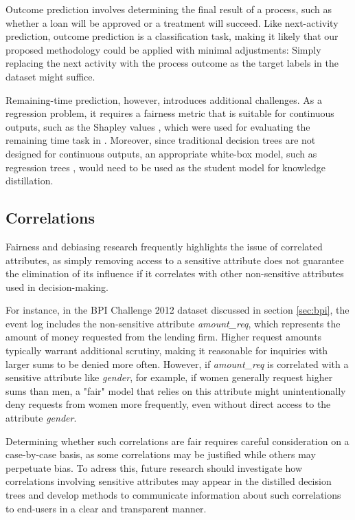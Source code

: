 Outcome prediction involves determining the final result of a process,
such as whether a loan will be approved or a treatment will succeed.
Like next-activity prediction, outcome prediction is a classification task,
making it likely that our proposed methodology could be applied with minimal adjustments:
Simply replacing the next activity with the process outcome as the target labels in the dataset might suffice.

Remaining-time prediction, however, introduces additional challenges.
As a regression problem, it requires a fairness metric that is suitable for continuous outputs,
such as the Shapley values \cite{shapley}, which were used for evaluating the remaining time task in \cite{fairness_adversarial}. 
Moreover, since traditional decision trees are not designed for continuous outputs,
an appropriate white-box model, such as regression trees \cite{trees},
would need to be used as the student model for knowledge distillation.

\subsection*{Correlations}
Fairness and debiasing research frequently highlights the issue of correlated attributes,
as simply removing access to a sensitive attribute does not guarantee the elimination of its influence
if it correlates with other non-sensitive attributes used in decision-making.

For instance, in the BPI Challenge 2012 dataset discussed in section \ref{sec:bpi},
the event log includes the non-sensitive attribute \textit{amount\_req},
which represents the amount of money requested from the lending firm.
Higher request amounts typically warrant additional scrutiny,
making it reasonable for inquiries with larger sums to be denied more often. 
However, if \textit{amount\_req} is correlated with a sensitive attribute like \textit{gender},
for example, if women generally request higher sums than men,
a "fair" model that relies on this attribute might unintentionally deny requests from women more frequently,
even without direct access to the attribute \textit{gender}.

Determining whether such correlations are fair requires careful consideration on a case-by-case basis,
as some correlations may be justified while others may perpetuate bias.
To adress this, future research should investigate how correlations involving sensitive attributes may
appear in the distilled decision trees and develop methods to communicate information about such correlations
to end-users in a clear and transparent manner.

